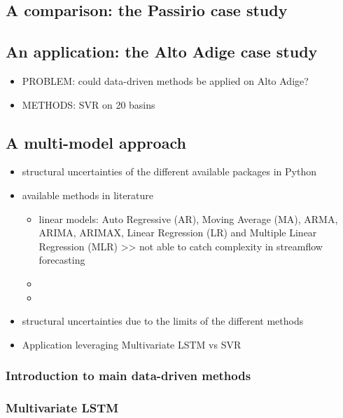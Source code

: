 \subsection{A comparison: the Passirio case study}

\subsection{An application: the Alto Adige case study}
% 
\begin{itemize}
    \item PROBLEM: could data-driven methods be applied on Alto Adige?
    \item METHODS: SVR on 20 basins
\end{itemize}
% 

% 
\subsection{A multi-model approach
\label{section.sub.3.2.4:multimodel}}
% 
\begin{itemize}
    \item structural uncertainties of the different available packages in Python
    \item available methods in literature
        \begin{itemize}
            \item linear models: Auto Regressive (AR), Moving Average (MA), ARMA, ARIMA, ARIMAX, Linear Regression (LR) and Multiple Linear Regression (MLR) >> not able to catch complexity in streamflow forecasting
            \item 
            \item 
        \end{itemize}
    \item structural uncertainties due to the limits of the different methods
    \item Application leveraging Multivariate LSTM vs SVR
\end{itemize}

\subsubsection{Introduction to main data-driven methods}


\subsubsection{Multivariate LSTM}




